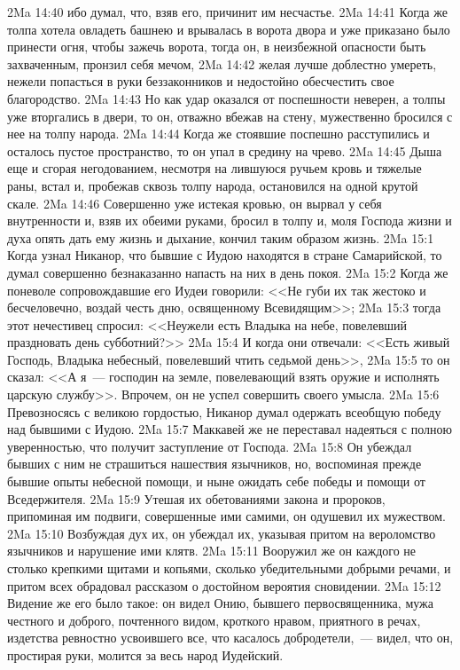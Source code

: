 \vs 2Ma 14:40 ибо думал, что, взяв его, причинит им несчастье.
\vs 2Ma 14:41 Когда же толпа хотела овладеть башнею и врывалась в ворота двора и уже приказано было принести огня, чтобы зажечь ворота, тогда он, в неизбежной опасности быть захваченным, пронзил себя мечом,
\vs 2Ma 14:42 желая лучше доблестно умереть, нежели попасться в руки беззаконников и недостойно обесчестить свое благородство.
\vs 2Ma 14:43 Но как удар оказался от поспешности неверен, а толпы уже вторгались в двери, то он, отважно вбежав на стену, мужественно бросился с нее на толпу народа.
\vs 2Ma 14:44 Когда же стоявшие поспешно расступились и осталось пустое пространство, то он упал в средину на чрево.
\vs 2Ma 14:45 Дыша еще и сгорая негодованием, несмотря на лившуюся ручьем кровь и тяжелые раны, встал и, пробежав сквозь толпу народа, остановился на одной крутой скале.
\vs 2Ma 14:46 Совершенно уже истекая кровью, он вырвал у себя внутренности и, взяв их обеими руками, бросил в толпу и, моля Господа жизни и духа опять дать ему жизнь и дыхание, кончил таким образом жизнь.
\vs 2Ma 15:1 Когда узнал Никанор, что бывшие с Иудою находятся в стране Самарийской, то думал совершенно безнаказанно напасть на них в день покоя.
\vs 2Ma 15:2 Когда же поневоле сопровождавшие его Иудеи говорили: <<Не губи их так жестоко и бесчеловечно, воздай честь дню, освященному Всевидящим>>;
\vs 2Ma 15:3 тогда этот нечестивец спросил: <<Неужели есть Владыка на небе, повелевший праздновать день субботний?>>
\vs 2Ma 15:4 И когда они отвечали: <<Есть живый Господь, Владыка небесный, повелевший чтить седьмой день>>,
\vs 2Ma 15:5 то он сказал: <<А я~--- господин на земле, повелевающий взять оружие и исполнять царскую службу>>. Впрочем, он не успел совершить своего умысла.
\vs 2Ma 15:6 Превозносясь с великою гордостью, Никанор думал одержать всеобщую победу над бывшими с Иудою.
\vs 2Ma 15:7 Маккавей же не переставал надеяться с полною уверенностью, что получит заступление от Господа.
\vs 2Ma 15:8 Он убеждал бывших с ним не страшиться нашествия язычников, но, воспоминая прежде бывшие опыты небесной помощи, и ныне ожидать себе победы и помощи от Вседержителя.
\vs 2Ma 15:9 Утешая их обетованиями закона и пророков, припоминая им подвиги, совершенные ими самими, он одушевил их мужеством.
\vs 2Ma 15:10 Возбуждая дух их, он убеждал их, указывая притом на вероломство язычников и нарушение ими клятв.
\vs 2Ma 15:11 Вооружил же он каждого не столько крепкими щитами и копьями, сколько убедительными добрыми речами, и притом всех обрадовал рассказом о достойном вероятия сновидении.
\rsbpar\vs 2Ma 15:12 Видение же его было такое: он видел Онию, бывшего первосвященника, мужа честного и доброго, почтенного видом, кроткого нравом, приятного в речах, издетства ревностно усвоившего все, что касалось добродетели,~--- видел, что он, простирая руки, молится за весь народ Иудейский.
